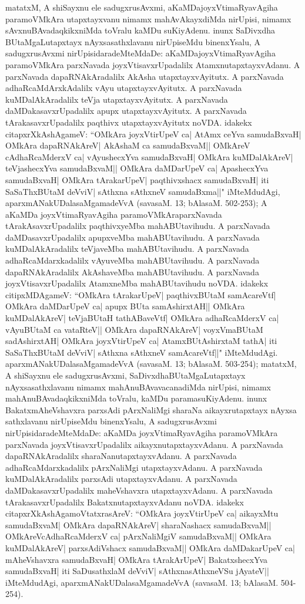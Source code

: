 \begin{entry}
{{matatxM, A shiSayxnu ele sadugxrusAvxmi, aKaMDajoyxVtimaRyavAgiha paramoVMkAra utapxtayxvanu nimamx mahAvAkayxdiMda nirUpisi, nimamx sAvxnuBAvadaqkikxniMda toVralu kaMDu suKiyAdenu. inunx SaDivxdha BUtaMgaLutapxtayx nAyxsasathxlavanu nirUpiseMdu binenxYsalu, A sadugxrusAvxmi nirUpisidaradeMteMdaDe: aKaMDajoyxVtimaRyavAgiha paramoVMkAra parxNavada joyxVtisavxrUpadalilx AtamxnutapxtayxvAdanu. A parxNavada dapaRNAkAradalilx AkAsha utapxtayxvAyitutx. A parxNavada adhaRcaMdArxkAdalilx vAyu utapxtayxvAyitutx. A parxNavada kuMDalAkAradalilx teVja utapxtayxvAyitutx. A parxNavada daMDakasavxrUpadalilx apupx utapxtayxvAyitutx. A parxNavada tArakasavxrUpadalilx paqthivx utapxtayxvAyitutx noVDA. idakekx citapxrXkAshAgameV: ``OMkAra joyxVtirUpeV ca| AtAmx ceYva samudaBxvaH| OMkAra dapaRNAkAreV| AkAshaM ca samudaBxvaM|| OMkAreV cAdhaRcaMderxV ca| vAyushecxYva samudaBxvaH| OMkAra kuMDalAkAreV| teVjashecxYva samudaBxvaM|| OMkAra daMDarUpeV ca| ApashecxYva samudaBxvaH| OMkAra tArakarUpeV| paqthivxshacx samudaBxvaH| iti SaSaThxBUtaM deVviV| sAthxna sAthxneV samudaBxma||" iMteMdudAgi, aparxmANakUDalasaMgamadeVvA (savasaM. 13; bAlasaM. 502-253); A aKaMDa joyxVtimaRya\-vAgiha paramoVMkAraparxNavada tArakAsavxrUpadalilx paqthivxyeMba mahA\-BUtavihudu. A parxNavada daMDasavxrUpadalilx apupxveMba mahABUtavihudu. A parxNavada kuMDalAkAradalilx teVjaveMba mahABUtavihudu. A parxNavada adhaRcaMdarxkadalilx vAyuveMba mahABUtavihudu. A parxNavada dapaRNAkAradalilx AkAshaveMba mahABUtavihudu. A parxNavada joyxVtisavxrUpadalilx AtamxneMba mahABUtavihudu noVDA. idakekx citipxMDAgameV: ``OMkAra tArakarUpeV| paqthivxBUtaM samAcareVtf| OMkAra daMDarUpeV ca| apupx BUta samAshirxtAH|| OMkAra kuMDalAkAreV| teVja\-BUtaH tathABaveVtf| OMkAra adhaRcaMderxV ca| vAyuBUtaM ca vataRteV|| OMkAra dapaRNAkAreV| voyxVmaBUtaM sadAshirxtAH| OMkAra joyxVtirUpeV ca| AtamxBUtAshirxtaM tathA| iti SaSaThxBUtaM deVviV| sAthxna sAthxneV samAcareVtf||" iMteMdudAgi. aparxmANakUDalasaMgamadeVvA (savasaM. 13; bAlasaM. 503-254); matatxM, A shiSayxnu ele sadugxrusAvxmi, SaDivxdhaBUtaMgaLutapxtayx nAyxsasathxlavanu nimamx mahAnuBAvavacanadiMda nirUpisi, nimamx mahAnuBAvadaqkikxniMda toVralu, kaMDu paramasuKiyAdenu. inunx BakatxmAheVshavxra parxsAdi pArxNaliMgi sharaNa aikayxrutapxtayx nAyxsa sathxlavanu nirUpiseMdu binenxYsalu, A sadugxrusAvxmi nirUpisidaradeMteMdaDe: aKaMDa joyxVtimaRyavAgiha paramoVMkAra parxNavada joyxVtisavxrUpadalilx aikayxnutapxtayxvAdanu. A parxNavada dapaRNAkAradalilx sharaNanutapxtayxvAdanu. A parxNavada adhaRcaMdarxkadalilx pArxNaliMgi utapxtayxvAdanu. A parxNavada kuMDalAkAradalilx parxsAdi utapxtayxvAdanu. A parxNavada daMDakasavxrUpadalilx maheVshavxra utapxtayxvAdanu. A parxNavada tArakasavxrUpadalilx BakatxnutapxtayxvAdanu noVDA. idakekx citapxrXkAshAgamoVtatxrasAreV: ``OMkAra joyxVtirUpeV ca| aikayxMtu samu\-daBxvaM| OMkAra dapaRNAkAreV| sharaNashacx samudaBxvaM|| OMkAreVcAdhaRcaMderxV ca| pArxNaliMgiV samudaBxvaM|| OMkAra kuMDalAkAreV| parxsAdiVshacx samudaBxvaM|| OMkAra daMDakarUpeV ca| mAheVshavxra samudaBxvaH| OMkAra tArakA\-rUpeV| BakatxshecxYva samudaBxvaH| iti SaDusathxlaM deVviV| sAthxnasAthxneVSu jAyateV|| iMteMdudAgi, aparxmANakUDalasaMgamadeVvA (\hbox{savasaM.} 13; bAlasaM. 504-254).}}
\end{entry}

